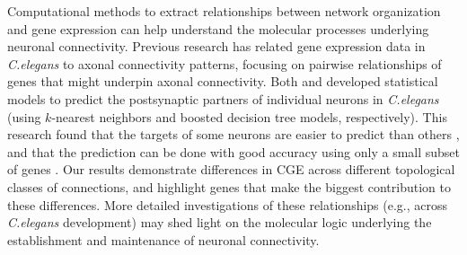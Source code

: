 {Computational methods to extract relationships between network organization and gene expression can help understand the molecular processes underlying neuronal connectivity.
Previous research has related gene expression data in \textit{C.elegans} to axonal connectivity patterns, focusing on pairwise relationships of genes that might underpin axonal connectivity.
Both \mbox{\citet{Kaufman2006}} and \mbox{\citet{Baruch2008}} developed statistical models to predict the postsynaptic partners of individual neurons in \textit{C.elegans} (using $k$-nearest neighbors and boosted decision tree models, respectively).
This research found that the targets of some neurons are easier to predict than others \mbox{\citep{Kaufman2006}}, and that the prediction can be done with good accuracy using only a small subset of genes \citep{Baruch2008}.
Our results demonstrate differences in CGE across different topological classes of connections, and highlight genes that make the biggest contribution to these differences.
More detailed investigations of these relationships (e.g., across \textit{C.elegans} development) may shed light on the molecular logic underlying the establishment and maintenance of neuronal connectivity.

}
